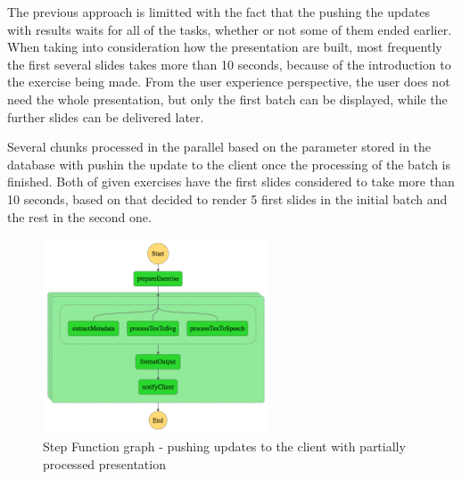 The previous approach is limitted with the fact that the pushing the updates with results waits for all of the tasks, whether or not some of them ended earlier. When taking into consideration how the presentation are built, most frequently the first several slides takes more than 10 seconds, because of the introduction to the exercise being made. From the user experience perspective, the user does not need the whole presentation, but only the first batch can be displayed, while the further slides can be delivered later.

Several chunks processed in the parallel based on the parameter stored in the database with pushin the update to the client once the processing of the batch is finished. Both of given exercises have the first slides considered to take more than 10 seconds, based on that decided to render 5 first slides in the initial batch and the rest in the second one.

\begin{figure}[H]
    \centering
    \includegraphics[width=0.6\textwidth]{assets/04-serverless-for-web-apps/stepFunctionGraphInitialBatch.png}
    \caption{Step Function graph - pushing updates to the client with partially processed presentation}
    \label{fig:step-function-pushing-updates-to-the-client-with-partially-processed-presentation}
\end{figure}

\datasetUploadInitialBatch

